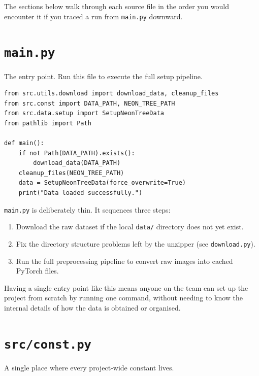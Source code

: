 \documentclass[11pt, a4paper]{article}
\newenvironment{filebox}[1]{%
  \begin{tcolorbox}[
    colback=filebg, colframe=fileframe,
    fonttitle=\bfseries\ttfamily, title=#1,
    breakable, enhanced
  ]
}{%
  \end{tcolorbox}
}
\begin{document}
The sections below walk through each source file in the order you would
encounter it if you traced a run from \texttt{main.py} downward.

\section{\texttt{main.py}}

\begin{filebox}{main.py}
  The entry point. Run this file to execute the full setup pipeline.
\end{filebox}

\begin{lstlisting}
from src.utils.download import download_data, cleanup_files
from src.const import DATA_PATH, NEON_TREE_PATH
from src.data.setup import SetupNeonTreeData
from pathlib import Path

def main():
    if not Path(DATA_PATH).exists():
        download_data(DATA_PATH)
    cleanup_files(NEON_TREE_PATH)
    data = SetupNeonTreeData(force_overwrite=True)
    print("Data loaded successfully.")
\end{lstlisting}

\texttt{main.py} is deliberately thin. It sequences three steps:

\begin{enumerate}[nosep]
  \item Download the raw dataset if the local \texttt{data/} directory does
        not yet exist.
  \item Fix the directory structure problems left by the unzipper
        (see \texttt{download.py}).
  \item Run the full preprocessing pipeline to convert raw images into cached
        PyTorch files.
\end{enumerate}

Having a single entry point like this means anyone on the team can set up the
project from scratch by running one command, without needing to know the
internal details of how the data is obtained or organised.

\section{\texttt{src/const.py}}

\begin{filebox}{src/const.py}
  A single place where every project-wide constant lives.
\end{filebox}
\end{document}

